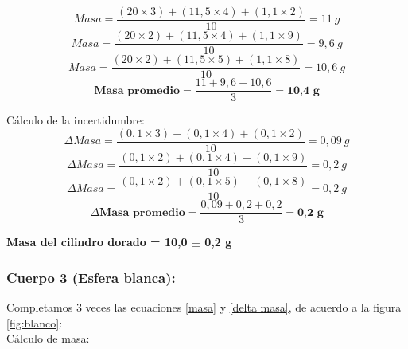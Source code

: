 \documentclass[10pt]{article}
\begin{document}
\begin{equation*} 
    Masa = \frac{(20\times3)+(11,5\times4)+(1,1\times2)}{10} = 11~g
\end{equation*}
\begin{equation*}
    Masa = \frac{(20\times2)+(11,5\times4)+(1,1\times9)}{10} = 9,6~g
\end{equation*}
\begin{equation*}
    Masa = \frac{(20\times2)+(11,5\times5)+(1,1\times8)}{10} = 10,6~g
\end{equation*}
\vspace{0.2cm}
\begin{equation*}
    \textbf{Masa~promedio}= \frac{11+9,6+10,6}{3} = \textbf{10,4~g}
\end{equation*}
\vspace{0.1cm}

Cálculo de la incertidumbre:
\begin{equation*}
     \Delta Masa =\frac{(0,1\times3)+(0,1\times4)+(0,1\times2)}{10} = 0,09~g
\end{equation*}
\begin{equation*}
     \Delta Masa =\frac{(0,1\times2)+(0,1\times4)+(0,1\times9)}{10} = 0,2~g
\end{equation*}
\begin{equation*}
     \Delta Masa =\frac{(0,1\times2)+(0,1\times5)+(0,1\times8)}{10} = 0,2~g
\end{equation*}
\vspace{0.2cm}
\begin{equation*}
    \Delta \textbf{Masa~promedio} = \frac{0,09+0,2+0,2}{3} = \textbf{0,2~g}
\end{equation*}

\vspace{0.3cm}
\begin{center}
    \textbf{Masa del cilindro dorado = 10,0 $\pm$ 0,2 g}
\end{center}
\vspace{0.1cm}

\subsubsection{Cuerpo 3 (Esfera blanca):}
\vspace{0,2cm}

Completamos 3 veces las ecuaciones \ref{masa} y \ref{delta masa}, de acuerdo a la figura \ref{fig:blanco}:\\

Cálculo de masa:
\end{document}
